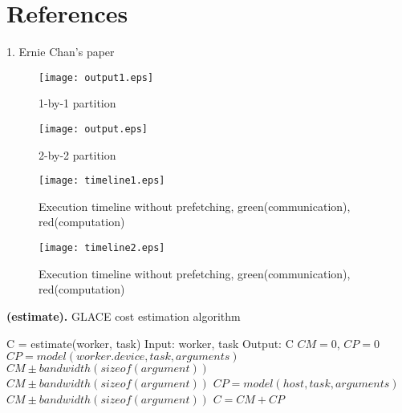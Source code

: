 \documentclass[preprint,11pt]{elsarticle}
\begin{document}
\section{References}


\cite{lin2010application}
\cite{guyer2004broadway}
\cite{van2009libflame}
\cite{vanlibflame}
\cite{van2008science}



	\renewcommand\refname{\vskip -1cm}
	
	








1. Ernie Chan's paper




\begin{figure}
  \centering
  \texttt{[image: output1.eps]} 
  \caption{1-by-1 partition}
  \label{fig:dep1}
\end{figure}
\begin{figure}
  \centering
  \texttt{[image: output.eps]} 
  \caption{2-by-2 partition}
  \label{fig:dep2}
\end{figure}

\begin{figure}
\begin{minipage} [t] {0.5\textwidth}
  \texttt{[image: timeline1.eps]} 
  \caption{Execution timeline without prefetching, green(communication), red(computation)}
  \label{fig:timeline1}
\end{minipage}
\begin{minipage} [t] {0.5\textwidth}
  \texttt{[image: timeline2.eps]} 
  \caption{Execution timeline without prefetching, green(communication), red(computation)}
  \label{fig:timeline2}
\end{minipage}
\end{figure}

\begin{algorithm}
\caption{{\bf (estimate).} GLACE cost estimation algorithm}
\label{alg:estimate}
{\footnotesize
\begin{algorithmic} [1]
\STATE C = estimate(worker, task)
\STATE Input: worker, task
\STATE Output: C
\STATE $CM = 0$, $CP = 0$
  \STATE $CP = model(worker.device, task, arguments)$
      \STATE $CM \pm bandwidth(sizeof(argument))$
        \STATE $CM \pm bandwidth(sizeof(argument))$
      \ENDIF
    \ENDIF
  \ENDFOR 
\ELSE
  \STATE $CP = model(host, task, arguments)$
      \STATE $CM \pm bandwidth(sizeof(argument))$
    \ENDIF
  \ENDFOR 
\ENDIF
\STATE $C = CM + CP$
\end{algorithmic}
}
\end{algorithm}
\end{document}
